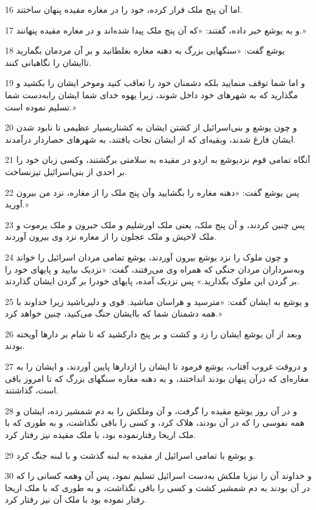 \par 16 اما آن پنج ملک فرار کرده، خود را در مغاره مقیده پنهان ساختند.
\par 17 و به یوشع خبر داده، گفتند: «که آن پنج ملک پیدا شده‌اند و در مغاره مقیده پنهانند.»
\par 18 یوشع گفت: «سنگهایی بزرگ به دهنه مغاره بغلطانید و بر آن مردمان بگمارید تاایشان را نگاهبانی کنند.
\par 19 و اما شما توقف منمایید بلکه دشمنان خود را تعاقب کنید وموخر ایشان را بکشید و مگذارید که به شهرهای خود داخل شوند، زیرا یهوه خدای شما ایشان رابه‌دست شما تسلیم نموده است.»
\par 20 و چون یوشع و بنی‌اسرائیل از کشتن ایشان به کشتاربسیار عظیمی تا نابود شدن ایشان فارغ شدند، وبقیه‌ای که از ایشان نجات یافتند، به شهرهای حصاردار درآمدند.
\par 21 آنگاه تمامی قوم نزدیوشع به اردو در مقیده به سلامتی برگشتند، وکسی زبان خود را بر احدی از بنی‌اسرائیل تیزنساخت.
\par 22 پس یوشع گفت: «دهنه مغاره را بگشایید وآن پنج ملک را از مغاره، نزد من بیرون آورید.»
\par 23 پس چنین کردند، و آن پنج ملک، یعنی ملک اورشلیم و ملک حبرون و ملک یرموت و ملک لاخیش و ملک عجلون را از مغاره نزد وی بیرون آوردند.
\par 24 و چون ملوک را نزد یوشع بیرون آوردند، یوشع تمامی مردان اسرائیل را خواند وبه‌سرداران مردان جنگی که همراه وی می‌رفتند، گفت: «نزدیک بیایید و پایهای خود را بر گردن این ملوک بگذارید.» پس نزدیک آمده، پایهای خودرا بر گردن ایشان گذاردند.
\par 25 و یوشع به ایشان گفت: «مترسید و هراسان مباشید. قوی و دلیرباشید زیرا خداوند با همه دشمنان شما که باایشان جنگ می‌کنید، چنین خواهد کرد.»
\par 26 وبعد از آن یوشع ایشان را زد و کشت و بر پنج دارکشید که تا شام بر دارها آویخته بودند.
\par 27 و دروقت غروب آفتاب، یوشع فرمود تا ایشان را ازدارها پایین آوردند، و ایشان را به مغاره‌ای که درآن پنهان بودند انداختند، و به دهنه مغاره سنگهای بزرگ که تا امروز باقی است، گذاشتند.
\par 28 و در آن روز یوشع مقیده را گرفت، و آن وملکش را به دم شمشیر زده، ایشان و همه نفوسی را که در آن بودند، هلاک کرد، و کسی را باقی نگذاشت، و به طوری که با ملک اریحا رفتارنموده بود، با ملک مقیده نیز رفتار کرد.
\par 29 و یوشع با تمامی اسرائیل از مقیده به لبنه گذشت و با لبنه جنگ کرد.
\par 30 و خداوند آن را نیزبا ملکش به‌دست اسرائیل تسلیم نمود، پس آن وهمه کسانی را که در آن بودند به دم شمشیر کشت و کسی را باقی نگذاشت، و به طوری که با ملک اریحا رفتار نموده بود با ملک آن نیز رفتار کرد.
